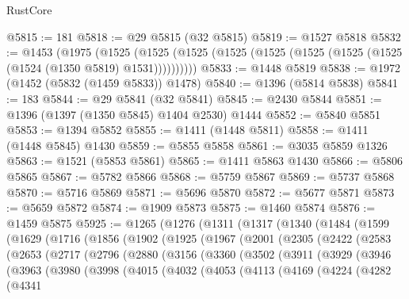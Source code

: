 \begin{lexlean}{RustCore}
\begin{coremodule}
@5815 := 181
@5818 := @29 @5815 (@32 @5815)
@5819 := @1527 @5818
@5832 := @1453
    (@1975
      (@1525 (@1525 (@1525 (@1525 (@1525 (@1525 (@1525 (@1525 (@1524 (@1350 @5819) @1531))))))))))
@5833 := @1448 @5819
@5838 := @1972 (@1452 (@5832 (@1459 @5833)) @1478)
@5840 := @1396 (@5814 @5838)
@5841 := 183
@5844 := @29 @5841 (@32 @5841)
@5845 := @2430 @5844
@5851 := @1396 (@1397 (@1350 @5845) @1404 @2530) @1444
@5852 := @5840 @5851
@5853 := @1394 @5852
@5855 := @1411 (@1448 @5811)
@5858 := @1411 (@1448 @5845) @1430
@5859 := @5855 @5858
@5861 := @3035 @5859 @1326
@5863 := @1521 (@5853 @5861)
@5865 := @1411 @5863 @1430
@5866 := @5806 @5865
@5867 := @5782 @5866
@5868 := @5759 @5867
@5869 := @5737 @5868
@5870 := @5716 @5869
@5871 := @5696 @5870
@5872 := @5677 @5871
@5873 := @5659 @5872
@5874 := @1909 @5873
@5875 := @1460 @5874
@5876 := @1459 @5875
@5925 := @1265
    (@1276
      (@1311
        (@1317
          (@1340
            (@1484
              (@1599
                (@1629
                  (@1716
                    (@1856
                      (@1902
                        (@1925
                          (@1967
                            (@2001
                              (@2305
                                (@2422
                                  (@2583
                                    (@2653
                                      (@2717
                                        (@2796
                                          (@2880
                                            (@3156
                                              (@3360
                                                (@3502
                                                  (@3911
                                                    (@3929
                                                      (@3946
                                                        (@3963
                                                          (@3980
                                                            (@3998
                                                              (@4015
                                                                (@4032
                                                                  (@4053
                                                                    (@4113
                                                                      (@4169
                                                                        (@4224
                                                                          (@4282
                                                                            (@4341

\end{coremodule}
\end{lexlean}
